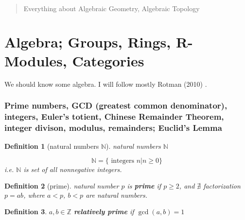 \documentclass[10pt]{amsart}
\newtheorem{definition}{Definition}
\begin{document}
\begin{multicols*}{2}

  
\setcounter{tocdepth}{1}
\tableofcontents



\begin{abstract}
Everything about Algebraic Geometry, Algebraic Topology

\end{abstract}

\part{Algebra; Groups, Rings, R-Modules, Categories}

We should know some algebra.  I will follow mostly Rotman (2010) \cite{JRotman2010}.  

\section{Prime numbers, GCD (greatest common denominator), integers, Euler's totient, Chinese Remainder Theorem, integer divison, modulus, remainders; Euclid's Lemma}



\begin{definition}[natural numbers $\mathbb{N}$]
	natural numbers $\mathbb{N}$  
	
	\begin{equation}
	\mathbb{N} = \lbrace \text{ integers } n | n \geq 0 \rbrace  
	\end{equation}
i.e. $\mathbb{N}$ is set of all nonnegative integers.  	
\end{definition}

\begin{definition}[prime]
natural number $p$ is \textbf{prime} if $p\geq 2$, and $\nexists$ \emph{ factorization} $p=ab$, where $a<p$, $b<p$ are natural numbers.  	
\end{definition}

\begin{definition}
	$a,b\in \mathbb{Z}$ \textbf{relatively prime} if $\gcd(a,b)=1 $
\end{definition}







\end{multicols*}
\end{document}
